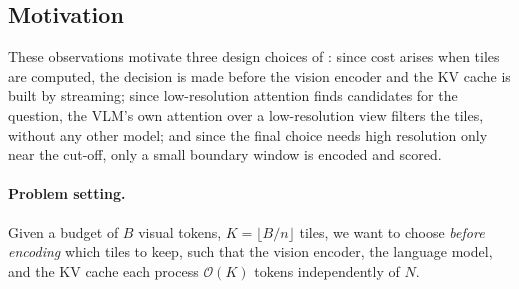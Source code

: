 \subsection{Motivation}
\label{sec:design}

These observations motivate three design choices of \method: since cost arises when tiles are computed, the
decision is made before the vision encoder and the KV cache is built by streaming; since low-resolution
attention finds candidates for the question, the VLM's own attention over a low-resolution view filters the
tiles, without any other model; and since the final choice needs high resolution only near the cut-off, only
a small boundary window is encoded and scored.

\paragraph{Problem setting.}
Given a budget of $B$ visual tokens, \ie $K=\lfloor B/n\rfloor$ tiles, we want to choose \emph{before
encoding} which tiles to keep, such that the vision encoder, the language model, and the KV cache
each process $\mathcal{O}(K)$ tokens independently of $N$.

